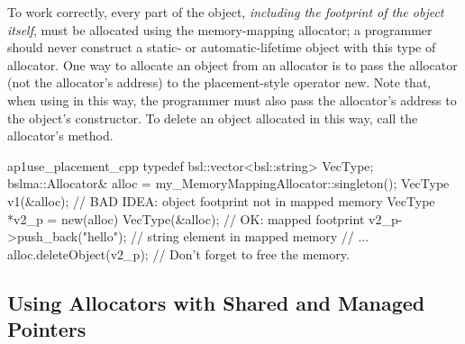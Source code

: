 To work correctly, every part of the object, \emph{including the footprint of the object
itself}, must be allocated using the memory-mapping allocator; a programmer
should never construct a static- or automatic-lifetime object with this type of
allocator. One way to allocate an object from an allocator is to pass the
allocator (not the allocator’s address) to the placement-style operator new.
Note that, when using  in this way, the programmer must also
pass the allocator’s address to the object’s constructor. To delete an object
allocated in this way, call the allocator’s  method.
\begin{cppcodeblock}{ap1use_placement_cpp}
    typedef bsl::vector<bsl::string> VecType;
    bslma::Allocator& alloc = my_MemoryMappingAllocator::singleton();
    VecType v1(&alloc); // BAD IDEA: object footprint not in mapped memory
    VecType *v2_p = new(alloc) VecType(&alloc); // OK: mapped footprint
    v2_p->push_back("hello"); // string element in mapped memory
    // ...
    alloc.deleteObject(v2_p); // Don’t forget to free the memory.
\end{cppcodeblock}

\subsection{Using Allocators with Shared and Managed Pointers}

